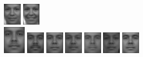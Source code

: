 \begin{figure}[hbt]
  \includegraphics[width=0.08\textwidth]{../results/H_rez/incorrect80/1/9.jpg}
  \includegraphics[width=0.08\textwidth]{../results/H_rez/incorrect80/1/10.jpg} \\
  \vspace{4pt}
  \includegraphics[width=0.1\textwidth]{../results/H_rez/incorrect80/2/testImg.jpg} \vline
  \hspace{2pt}
  \includegraphics[width=0.08\textwidth]{../results/H_rez/incorrect80/2/1.jpg}
  \includegraphics[width=0.08\textwidth]{../results/H_rez/incorrect80/2/2.jpg}
  \includegraphics[width=0.08\textwidth]{../results/H_rez/incorrect80/2/3.jpg}
  \includegraphics[width=0.08\textwidth]{../results/H_rez/incorrect80/2/4.jpg}
  \includegraphics[width=0.08\textwidth]{../results/H_rez/incorrect80/2/5.jpg}
  \includegraphics[width=0.08\textwidth]{../results/H_rez/incorrect80/2/6.jpg}

\end{figure}
